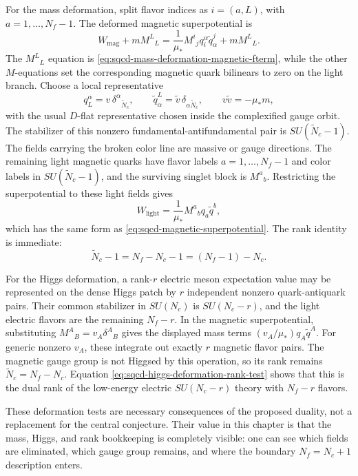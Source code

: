 For the mass deformation, split flavor indices as \(i=(a,L)\), with
\(a=1,\ldots,N_f-1\).  The deformed magnetic superpotential is
\[
  W_{\mathrm{mag}}+mM^L{}_L
  =
  \frac1{\mu_*}M^i{}_j q_i^\alpha\widetilde q^j_\alpha
  +mM^L{}_L .
\]
The \(M^L{}_L\) equation is
\eqref{eq:sqcd-mass-deformation-magnetic-fterm}, while the other
\(M\)-equations set the corresponding magnetic quark bilinears to zero on
the light branch.  Choose a local representative
\begin{equation}
  q_L^\alpha=v\,\delta^\alpha{}_{\widetilde N_c},
  \qquad
  \widetilde q^L_\alpha=\widetilde v\,\delta_{\alpha\widetilde N_c},
  \qquad
  v\widetilde v=-\mu_*m ,
  \label{eq:sqcd-magnetic-mass-higgs-representative}
\end{equation}
with the usual \(D\)-flat representative chosen inside the complexified
gauge orbit.  The stabilizer of this nonzero fundamental-antifundamental
pair is \(SU(\widetilde N_c-1)\).  The fields carrying the broken color line
are massive or gauge directions.  The remaining light magnetic quarks have
flavor labels \(a=1,\ldots,N_f-1\) and color labels in
\(SU(\widetilde N_c-1)\), and the surviving singlet block is \(M^a{}_b\).
Restricting the superpotential to these light fields gives
\[
  W_{\mathrm{light}}
  =
  \frac1{\mu_*}M^a{}_b q_a\widetilde q^b ,
\]
which has the same form as \eqref{eq:sqcd-magnetic-superpotential}.  The rank
identity is immediate:
\[
  \widetilde N_c-1=N_f-N_c-1=(N_f-1)-N_c .
\]

For the Higgs deformation, a rank-\(r\) electric meson expectation value may
be represented on the dense Higgs patch by \(r\) independent nonzero
quark-antiquark pairs.  Their common stabilizer in \(SU(N_c)\) is
\(SU(N_c-r)\), and the light electric flavors are the remaining
\(N_f-r\).  In the magnetic superpotential, substituting
\(M^A{}_B=v_A\delta^A{}_B\) gives the displayed mass terms
\((v_A/\mu_*)q_A\widetilde q^A\).  For generic nonzero \(v_A\), these
integrate out exactly \(r\) magnetic flavor pairs.  The magnetic gauge group
is not Higgsed by this operation, so its rank remains
\(\widetilde N_c=N_f-N_c\).  Equation
\eqref{eq:sqcd-higgs-deformation-rank-test} shows that this is the dual rank
of the low-energy electric \(SU(N_c-r)\) theory with \(N_f-r\) flavors.

These deformation tests are necessary consequences of the proposed duality,
not a replacement for the central conjecture.  Their value in this
chapter is that the mass, Higgs, and rank bookkeeping is completely visible:
one can see which fields are eliminated, which gauge group remains, and where
the boundary \(N_f=N_c+1\) description enters.

